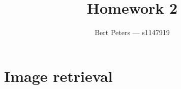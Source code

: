 \documentclass[12pt,a4paper]{article}
\title{Homework 2}
\author{Bert Peters --- s1147919}
\begin{document}
\maketitle

\section{Image retrieval}
\end{document}
